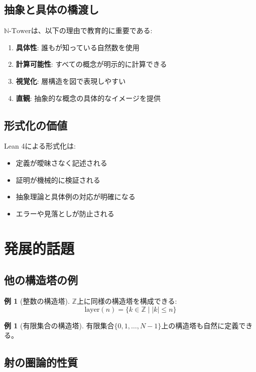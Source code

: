 \documentclass[a4paper,12pt]{article}
\theoremstyle{definition}
\newtheorem{example}[definition]{例}
\begin{document}
\subsection{抽象と具体の橋渡し}

$\mathbb{N}\text{-Tower}$は、以下の理由で教育的に重要である:

\begin{enumerate}
\item \textbf{具体性}: 誰もが知っている自然数を使用
\item \textbf{計算可能性}: すべての概念が明示的に計算できる
\item \textbf{視覚化}: 層構造を図で表現しやすい
\item \textbf{直観}: 抽象的な概念の具体的なイメージを提供
\end{enumerate}

\subsection{形式化の価値}

Lean 4による形式化は:
\begin{itemize}
\item 定義が曖昧さなく記述される
\item 証明が機械的に検証される
\item 抽象理論と具体例の対応が明確になる
\item エラーや見落としが防止される
\end{itemize}

\section{発展的話題}

\subsection{他の構造塔の例}

\begin{example}[整数の構造塔]
$\mathbb{Z}$上に同様の構造塔を構成できる:
\[
\text{layer}(n) = \{k \in \mathbb{Z} \mid |k| \leq n\}
\]
\end{example}

\begin{example}[有限集合の構造塔]
有限集合$\{0, 1, \ldots, N-1\}$上の構造塔も自然に定義できる。
\end{example}

\subsection{射の圏論的性質}
\end{document}
